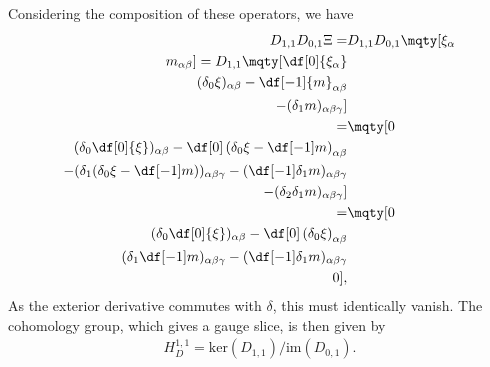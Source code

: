 Considering the composition of these operators, we have
\begin{align*}
	D_{1, 1}D_{0, 1}\Xi =& D_{1, 1}D_{0, 1}\mqty[
		\xi_{\alpha} \\
		m_{\alpha\beta}
	] = D_{1, 1}\mqty[
		\df[0]{\xi_{\alpha}} \\
		(\delta_{0}\xi)_{\alpha\beta} - \df[-1]{m}_{\alpha\beta} \\
		-(\delta_{1}m)_{\alpha\beta\gamma}
	] \\
	=& \mqty[
		0 \\
		(\delta_{0}\df[0]{\xi})_{\alpha\beta} - \df[0]\left(\delta_{0}\xi - \df[-1]m\right)_{\alpha\beta} \\
		-(\delta_{1}(\delta_{0}\xi - \df[-1]m))_{\alpha\beta\gamma} - (\df[-1]\delta_{1}m)_{\alpha\beta\gamma} \\
		-(\delta_{2}\delta_{1}m)_{\alpha\beta\gamma}
	] \\
	=& \mqty[
		0 \\
		(\delta_{0}\df[0]{\xi})_{\alpha\beta} - \df[0]\left(\delta_{0}\xi\right)_{\alpha\beta} \\
		(\delta_{1}\df[-1]m)_{\alpha\beta\gamma} - (\df[-1]\delta_{1}m)_{\alpha\beta\gamma} \\
		0
	],
\end{align*}
As the exterior derivative commutes with $\delta$, this must identically vanish. The cohomology group, which gives a gauge slice, is then given by
\begin{align*}
	H_{D}^{1, 1} = \text{ker}(D_{1, 1}) / \text{im}(D_{0, 1}).
\end{align*}

